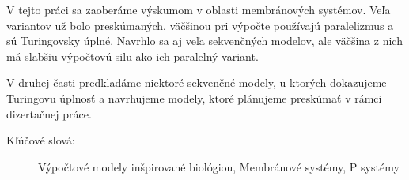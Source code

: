 V tejto práci sa zaoberáme výskumom v oblasti membránových systémov. Veľa variantov už bolo preskúmaných, väčšinou pri výpočte používajú paralelizmus a sú Turingovsky úplné. Navrhlo sa aj veľa sekvenčných modelov, ale väčšina z nich má slabšiu výpočtovú silu ako ich paralelný variant.

V druhej časti predkladáme niektoré sekvenčné modely, u ktorých dokazujeme Turingovu úplnosť a navrhujeme modely, ktoré plánujeme preskúmať v rámci dizertačnej práce.

\begin{description}
  \item[Kľúčové slová:] Výpočtové modely inšpirované biológiou, Membránové systémy, P systémy
\end{description}